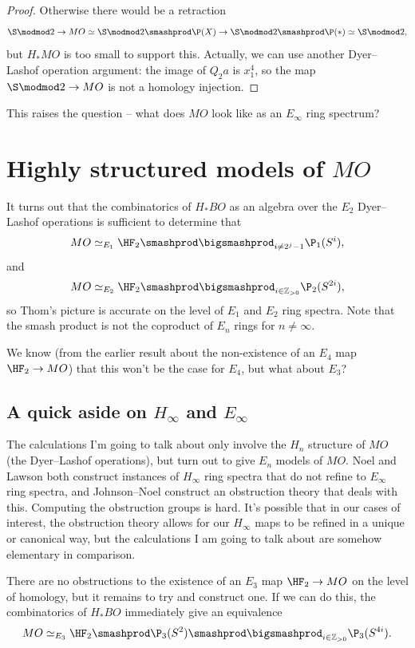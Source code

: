 \documentclass{article}
\begin{document}
\begin{proof}
    Otherwise there would be a retraction
    \[
        \S \modmod 2 \to MO \simeq \S \modmod 2 \smashprod \P(X) \to \S \modmod 2 \smashprod \P(*) \simeq \S \modmod 2,
    \]
    but $H_* MO$ is too small to support this.
    Actually, we can use another Dyer--Lashof operation argument: the image of $Q_2 a$ is $x_1^4$, so the map $\S \modmod 2 \to MO$ is not a homology injection.
\end{proof}

This raises the question -- what does $MO$ look like as an $E_\infty$ ring spectrum?

\section{Highly structured models of $MO$}
It turns out that the combinatorics of $H_* BO$ as an algebra over the $E_2$ Dyer--Lashof operations is sufficient to determine that
\[
    MO \simeq_{E_1} \HF_2 \smashprod \bigsmashprod_{i \neq 2^j - 1} \P_1(S^i),
\]
and
\[
    MO \simeq_{E_2} \HF_2 \smashprod \bigsmashprod_{i \in \mathbb{Z}_{> 0}} \P_2(S^{2i}),
\]
so Thom's picture is accurate on the level of $E_1$ and $E_2$ ring spectra.
Note that the smash product is not the coproduct of $E_n$ rings for $n \neq \infty$.

We know (from the earlier result about the non-existence of an $E_4$ map $\HF_2 \to MO$) that this won't be the case for $E_4$, but what about $E_3$?

\subsection*{A quick aside on $H_\infty$ and $E_\infty$}
The calculations I'm going to talk about only involve the $H_n$ structure of $MO$ (the Dyer--Lashof operations), but turn out to give $E_n$ models of $MO$.
Noel and Lawson both construct instances of $H_\infty$ ring spectra that do not refine to $E_\infty$ ring spectra, and Johnson--Noel construct an obstruction theory that deals with this.
Computing the obstruction groups is hard.
It's possible that in our cases of interest, the obstruction theory allows for our $H_\infty$ maps to be refined in a unique or canonical way, but the calculations I am going to talk about are somehow elementary in comparison.

There are no obstructions to the existence of an $E_3$ map $\HF_2 \to MO$ on the level of homology, but it remains to try and construct one.
If we can do this, the combinatorics of $H_* BO$ immediately give an equivalence
\[
    MO \simeq_{E_3} \HF_2 \smashprod \P_3(S^2) \smashprod \bigsmashprod_{i \in \mathbb{Z}_{> 0}} \P_3(S^{4i}).
\]
\end{document}
